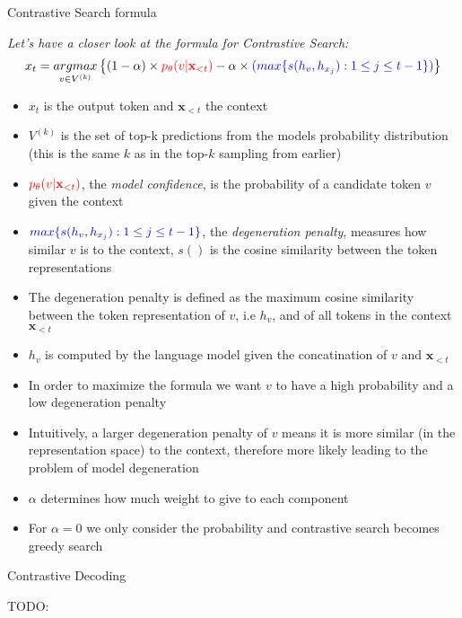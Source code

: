 \begin{vbframe}{Contrastive Search formula}


\hspace{}

\textit{Let's have a closer look at the formula for Contrastive Search:}
\small
$$x_t = \underset{v \in V^{(k)}}{argmax}\left\{(1 - \alpha) \times \textcolor{red}{p_\theta(v|\mathbf{x}_{<t})} - \alpha \times \textcolor{blue}{(max\{s(h_v,h_{x_j}):1\leq j \leq t-1\})}\right\}$$

\begin{itemize}
    \item $x_t$ is the output token and $\mathbf{x}_{<t}$ the context
    \item $V^{(k)}$ is the set of top-k predictions from the models probability distribution (this is the same $k$ as in the top-$k$ sampling from earlier)
    \item $\textcolor{red}{p_\theta(v|\mathbf{x}_{<t})}$, the \textit{model confidence}, is the probability of a candidate token $v$ given the context
    \item $\textcolor{blue}{max\{s(h_v,h_{x_j}):1\leq j \leq t-1\}}$, the \textit{degeneration penalty}, measures how similar $v$ is to the context, $s()$ is the cosine similarity between the token representations
    \item The degeneration penalty is defined as the maximum cosine similarity between the token representation of $v$, i.e $h_v$, and of all tokens in the context $\mathbf{x}_{<t}$
    \item $h_v$ is computed by the language model given the concatination of $v$ and $\mathbf{x}_{<t}$
    \item In order to maximize the formula we want $v$ to have a high probability and a low degeneration penalty
    \item Intuitively, a larger degeneration penalty of $v$ means it is more similar (in the representation space) to the context, therefore more likely leading to the problem of model degeneration
    \item $\alpha$ determines how much weight to give to each component
    \item For $\alpha = 0$ we only consider the probability and contrastive search becomes greedy search
\end{itemize}

\vfill

\end{vbframe}


\begin{frame}{Contrastive Decoding }


TODO:


\end{frame}


\endlecture
